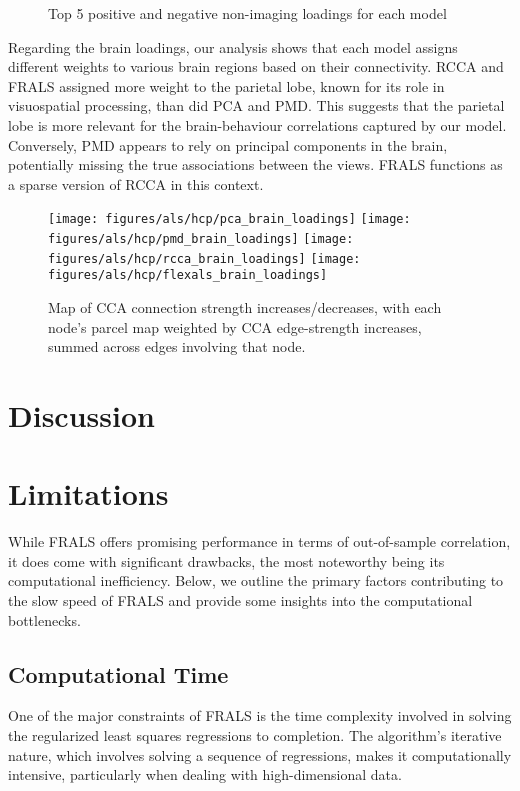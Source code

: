 \begin{figure}[h]
\centering

\caption*{Top 5 positive and negative non-imaging loadings for each model}
\label{fig:behaviour}
\end{figure}

Regarding the brain loadings, our analysis shows that each model assigns different weights to various brain regions
based on their connectivity.
RCCA and FRALS assigned more weight to the parietal lobe, known for its role in visuospatial processing, than did PCA and PMD. This suggests that the parietal lobe is more relevant for the brain-behaviour correlations captured by our model.
Conversely, PMD appears to rely on principal components in the brain, potentially missing the true associations between the views.
FRALS functions as a sparse version of RCCA in this context.

\begin{figure}[h]
\centering
\texttt{[image: figures/als/hcp/pca\_brain\_loadings]}
\texttt{[image: figures/als/hcp/pmd\_brain\_loadings]}
\texttt{[image: figures/als/hcp/rcca\_brain\_loadings]}
\texttt{[image: figures/als/hcp/flexals\_brain\_loadings]}
\caption*{Map of CCA connection strength increases/decreases, with each node’s parcel map weighted by CCA edge-strength increases, summed across edges involving that node.}
\label{fig:brain}
\end{figure}

\section{Discussion}


\section{Limitations}\label{sec:limitations}

While FRALS offers promising performance in terms of out-of-sample correlation, it does come with significant drawbacks, the most noteworthy being its computational inefficiency. Below, we outline the primary factors contributing to the slow speed of FRALS and provide some insights into the computational bottlenecks.

\subsection{Computational Time}\label{subsec:computational-time}
One of the major constraints of FRALS is the time complexity involved in solving the regularized least squares regressions to completion. The algorithm’s iterative nature, which involves solving a sequence of regressions, makes it computationally intensive, particularly when dealing with high-dimensional data.


